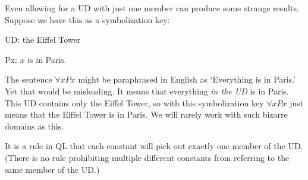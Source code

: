 Even allowing for a UD with just one member can produce some strange results. Suppose we have this as a symbolization key:
\begin{ekey}
\item[UD:] the Eiffel Tower
\item[Px:] $x$ is in Paris.
\end{ekey}
The sentence $\forall x Px$ might be paraphrased in English as `Everything is in Paris.' Yet that would be misleading. It means that everything \emph{in the UD} is in Paris. This UD contains only the Eiffel Tower, so with this symbolization key $\forall x Px$ just means that the Eiffel Tower is in Paris. We will rarely work with such bizarre domains as this.

It is a rule in QL that each constant will pick out exactly one member of the UD. (There is no rule prohibiting multiple different constants from referring to the same member of the UD.)

